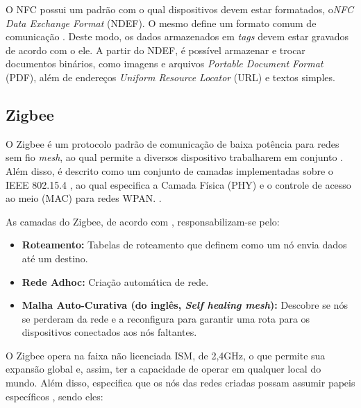 O NFC possui um padrão com o qual dispositivos devem estar formatados, o\textit{NFC Data Exchange Format} (NDEF). O mesmo define um formato comum de comunicação \cite{Igoe2014}. Deste modo, os dados armazenados em \textit{tags} devem estar gravados de acordo com o ele. A partir do NDEF, é possível armazenar e trocar documentos binários, como imagens e arquivos \textit{Portable Document Format} (PDF), além de endereços \textit{Uniform Resource Locator} (URL) e textos simples.


\subsection{Zigbee}

O Zigbee é um protocolo padrão de comunicação de baixa potência para redes sem fio \textit{mesh}, ao qual permite a diversos dispositivo trabalharem em conjunto \cite{Faludi2011}. Além disso, é descrito como um conjunto de camadas implementadas sobre o IEEE 802.15.4 \cite{Faludi2011}, ao qual especifica a Camada Física (PHY) e o controle de acesso ao meio (MAC) para redes WPAN. \cite{IEEE2011}.

As camadas do Zigbee, de acordo com , responsabilizam-se pelo:

\begin{itemize}[noitemsep,topsep=5pt]
	\item \textbf{Roteamento:} Tabelas de roteamento que definem como um nó envia dados até um 
	destino.
	\item \textbf{Rede Adhoc:} Criação automática de rede.
	\item \textbf{Malha Auto-Curativa (do inglês, \textit{Self healing mesh}):} Descobre se nós se perderam da rede e a 
	reconfigura para garantir uma rota para os dispositivos conectados aos nós faltantes.
\end{itemize}

O Zigbee opera na faixa não licenciada ISM, de 2,4GHz, o que permite sua expansão global e, assim, ter a capacidade de operar em qualquer local do mundo. Além disso, especifica que os nós das redes criadas possam assumir papeis específicos \cite{Faludi2011}, sendo eles:

